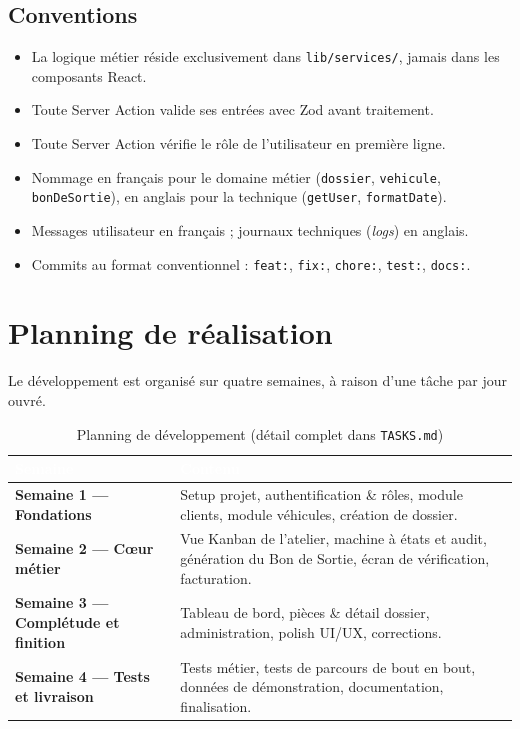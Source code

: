 \documentclass[11pt,a4paper]{report}
\begin{document}
\section{Conventions}

\begin{itemize}[leftmargin=1cm]
\item La logique métier réside exclusivement dans \texttt{lib/services/}, jamais dans les composants React.
\item Toute Server Action valide ses entrées avec Zod avant traitement.
\item Toute Server Action vérifie le rôle de l'utilisateur en première ligne.
\item Nommage en français pour le domaine métier (\texttt{dossier}, \texttt{vehicule},
      \texttt{bonDeSortie}), en anglais pour la technique (\texttt{getUser}, \texttt{formatDate}).
\item Messages utilisateur en français ; journaux techniques (\emph{logs}) en anglais.
\item Commits au format conventionnel : \texttt{feat:}, \texttt{fix:}, \texttt{chore:},
      \texttt{test:}, \texttt{docs:}.
\end{itemize}

\chapter{Planning de réalisation}

Le développement est organisé sur quatre semaines, à raison d'une tâche par jour ouvré.

\begin{table}[h!]
\centering
{}
\begin{tabularx}{\linewidth}{@{}l>{\raggedright\arraybackslash}X@{}}
\toprule
\rowcolor{km0blue}
\textcolor{white}{\textbf{Semaine}} & \textcolor{white}{\textbf{Contenu}} \\
\midrule
\textbf{Semaine 1 --- Fondations} & Setup projet, authentification \& rôles, module clients,
module véhicules, création de dossier. \\
\textbf{Semaine 2 --- Cœur métier} & Vue Kanban de l'atelier, machine à états et audit,
génération du Bon de Sortie, écran de vérification, facturation. \\
\textbf{Semaine 3 --- Complétude et finition} & Tableau de bord, pièces \& détail dossier,
administration, polish UI/UX, corrections. \\
\textbf{Semaine 4 --- Tests et livraison} & Tests métier, tests de parcours de bout en bout,
données de démonstration, documentation, finalisation. \\
\bottomrule
\end{tabularx}
\caption{Planning de développement (détail complet dans \texttt{TASKS.md})}
\end{table}
\end{document}
